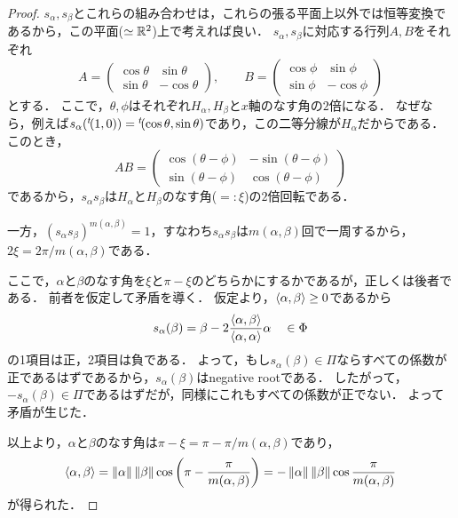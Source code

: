 \begin{proof}
  $s_\alpha, s_\beta$とこれらの組み合わせは，これらの張る平面上以外では恒等変換であるから，この平面($\simeq \mathbb{R}^2$)上で考えれば良い．
  $s_\alpha, s_\beta$に対応する行列$A, B$をそれぞれ
  \begin{equation}
    A = \begin{pmatrix}
      \cos\theta & \sin\theta \\
      \sin\theta & -\cos\theta
    \end{pmatrix},\qquad
    B = \begin{pmatrix}
      \cos\phi & \sin\phi \\
      \sin\phi & -\cos\phi
    \end{pmatrix}
  \end{equation}
  とする．
  ここで，$\theta, \phi$はそれぞれ$H_\alpha, H_\beta$と$x$軸のなす角の$2$倍になる．
  なぜなら，例えば$s_\alpha({}^t\!(1, 0)) = {}^t\!(\cos\theta, \sin\theta)$であり，この二等分線が$H_\alpha$だからである．
  このとき，
  \begin{equation}
    AB = \begin{pmatrix}
      \cos(\theta - \phi) & -\sin(\theta - \phi) \\
      \sin(\theta - \phi) & \cos(\theta - \phi)
    \end{pmatrix}
  \end{equation}
  であるから，$s_\alpha s_\beta$は$H_\alpha$と$H_\beta$のなす角($=: \xi$)の$2$倍回転である．

  一方，$(s_\alpha s_\beta)^{m(\alpha, \beta)} = 1$，すなわち$s_\alpha s_\beta$は$m(\alpha, \beta)$回で一周するから，$2\xi = 2\pi / m(\alpha, \beta)$である．

  ここで，$\alpha$と$\beta$のなす角を$\xi$と$\pi - \xi$のどちらかにするかであるが，正しくは後者である．
  前者を仮定して矛盾を導く．
  仮定より，$\left\langle \alpha, \beta \right\rangle \ge 0$であるから
  \begin{equation}
    s_\alpha(\beta) = \beta - 2\frac{\left\langle \alpha, \beta \right\rangle}{\left\langle \alpha, \alpha \right\rangle} \alpha \quad \in \Phi
  \end{equation}
  の1項目は正，2項目は負である．
  よって，もし$s_\alpha(\beta) \in \Pi$ならすべての係数が正であるはずであるから，$s_\alpha(\beta)$はnegative rootである．
  したがって，$-s_\alpha(\beta) \in \Pi$であるはずだが，同様にこれもすべての係数が正でない．
  よって矛盾が生じた．

  以上より，$\alpha$と$\beta$のなす角は$\pi - \xi = \pi - \pi/m(\alpha, \beta)$であり，
  \begin{equation}
    \left\langle \alpha, \beta \right\rangle
    = \left\| \alpha \right\| \left\| \beta \right\| \cos\left(\pi - \frac{\pi}{m(\alpha, \beta)}\right)
    = -\left\| \alpha \right\| \left\| \beta \right\| \cos\frac{\pi}{m(\alpha, \beta)}
  \end{equation}
  が得られた．
\end{proof}

